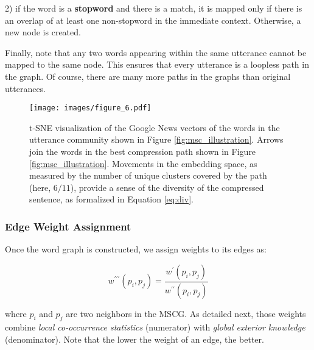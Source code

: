 \documentclass[11pt,a4paper]{article}
\begin{document}
2) if the word is a \textbf{stopword} and there is a match, it is mapped only if there is an overlap of at least one non-stopword in the immediate context. Otherwise, a new node is created.\\

\vspace{-0.35cm}

\noindent Finally, note that any two words appearing within the same utterance cannot be mapped to the same node. This ensures that every utterance is a loopless path in the graph. Of course, there are many more paths in the graphs than original utterances.

\begin{figure*}[!ht]
\centering
\captionsetup{size=small}
\begin{minipage}[c]{0.38\textwidth}
\caption{
t-SNE visualization \cite{maaten2008visualizing} of the Google News vectors of the words in the utterance community shown in Figure \ref{fig:msc_illustration}. Arrows join the words in the best compression path shown in Figure \ref{fig:msc_illustration}. Movements in the embedding space, as measured by the number of unique clusters covered by the path (here, $6/11$), provide a sense of the diversity of the compressed sentence, as formalized in Equation \ref{eq:div}.
} \label{fig:div_illustration}
\end{minipage}\hfill
\begin{minipage}[c]{0.6\textwidth}
\texttt{[image: images/figure\_6.pdf]}
\end{minipage}

\end{figure*}

\subsubsection*{Edge Weight Assignment}
Once the word graph is constructed, we assign weights to its edges as: 

\begin{equation}
w^{\prime\prime\prime} (p_i, p_j) = \frac{w^\prime (p_i, p_j)}{w^{\prime\prime} (p_i, p_j)}
\end{equation}\label{eq:e_w}

\noindent where $p_i$ and $p_j$ are two neighbors in the MSCG. As detailed next, those weights combine \textit{local co-occurrence statistics} (numerator) with \textit{global exterior knowledge} (denominator). Note that the lower the weight of an edge, the better.
\end{document}
